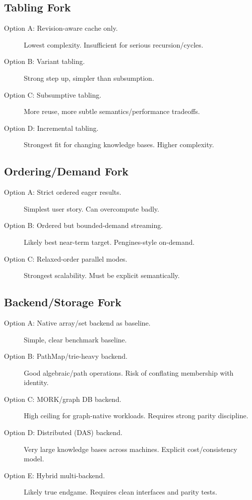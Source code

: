 \documentclass[11pt]{article}
\newcommand{\PathMap}{\textup{PathMap}}
\newcommand{\MORK}{\textup{MORK}}
\begin{document}
\subsection{Tabling Fork}

\begin{description}
\item[Option A: Revision-aware cache only.]
  Lowest complexity.  Insufficient for serious recursion/cycles.
\item[Option B: Variant tabling.]
  Strong step up, simpler than subsumption.
\item[Option C: Subsumptive tabling.]
  More reuse, more subtle semantics/performance tradeoffs.
\item[Option D: Incremental tabling.]
  Strongest fit for changing knowledge bases.  Higher complexity.
\end{description}

\subsection{Ordering/Demand Fork}

\begin{description}
\item[Option A: Strict ordered eager results.]
  Simplest user story.  Can overcompute badly.
\item[Option B: Ordered but bounded-demand streaming.]
  Likely best near-term target.  Pengines-style on-demand.
\item[Option C: Relaxed-order parallel modes.]
  Strongest scalability.  Must be explicit semantically.
\end{description}

\subsection{Backend/Storage Fork}

\begin{description}
\item[Option A: Native array/set backend as baseline.]
  Simple, clear benchmark baseline.
\item[Option B: \PathMap{}/trie-heavy backend.]
  Good algebraic/path operations.  Risk of conflating membership with identity.
\item[Option C: \MORK{}/graph DB backend.]
  High ceiling for graph-native workloads.  Requires strong parity discipline.
\item[Option D: Distributed (DAS) backend.]
  Very large knowledge bases across machines.  Explicit cost/consistency model.
\item[Option E: Hybrid multi-backend.]
  Likely true endgame.  Requires clean interfaces and parity tests.
\end{description}
\end{document}
